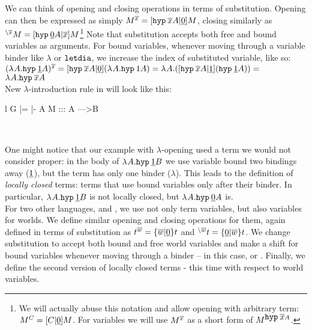 We can think of opening and closing operations in terms of substitution. Opening can then be expressed as simply $ M ^ {\overline{x}} = \mbox{$ [\mbox{$\operatorname{\texttt{hyp}}_{} {\overline{x}}$}A | \underline{0}] M$}$, closing similarly as ${}^ {\backslash{\overline{x}}} M = \mbox{$ [\mbox{$\operatorname{\texttt{hyp}}_{} {\underline{0}A}$} | \overline{x}] M$}$\footnote{We will actually abuse this notation and allow opening with arbitrary term: $M^C = \mbox{$ [C | \underline{0}] M$}$. For variables we will use $M ^ {\overline{x}}$ as a short form of $M^{\mbox{$\operatorname{\texttt{hyp}}_{} {\overline{x}}$}A}$.} 
Note that substitution accepts both free and bound variables as arguments. For bound variables, whenever moving through a variable binder like $\lambda$ or $\texttt{letdia}$, we increase the index of substituted variable, like so:\\
$(\lamb{A}{\hyp{\bvar 1}A})^{\fvar x}= \substt{\hyp{\fvar{x}}A}{\bvar{0}}{(\lamb{A}{\hyp{\bvar 1}A})} = \lamb{A}{(\substt{\hyp{\fvar{x}}A}{\bvar{1}} {(\hyp{\bvar{1}}A)})} =$\\$ \mbox{$\lambda_{} A . \mbox{$\operatorname{\texttt{hyp}}_{} {\overline{x}}$}A$}$\\

New $\lambda$-introduction rule in \langLF{} will look like this:

\begin{center}
\footnotesize
\begin{tabular}{ l }
			    {G |= \Gamma |- \lamb A M ::: A --->B}
\end{tabular}\\
\normalsize
\end{center}

One might notice that our example with $\lambda$-opening used a term we would not consider proper: in the body of $\mbox{$\lambda_{} A . \mbox{$\operatorname{\texttt{hyp}}_{} {\underline{1}}$}B$}$ we use variable bound two bindings away ($\underline{1}$), but the term has only one binder ($\lambda$). This leads to the definition of \emph{locally closed} terms: terms that use bound variables only after their binder. In particular, $\mbox{$\lambda_{} A . \mbox{$\operatorname{\texttt{hyp}}_{} {\underline{1}}$}B$}$ is not locally closed, but $\mbox{$\lambda_{} A . \mbox{$\operatorname{\texttt{hyp}}_{} {\underline{0}}$}A$}$ is.\\

For two other languages, \langHyb{} and \langL{}, we use not only term variables, but also variables for worlds. We define similar opening and closing operations for them, again defined in terms of substitution as $ t ^ {\overline{w}} = \mbox{$ \{\overline{w} | \underline{0} \} t$}$ and ${}^ {\backslash{\overline{w}}} t = \mbox{$ \{\underline{0} | \overline{w} \} t$}$. We change substitution to accept both bound and free world variables and make a shift for bound variables whenever moving through a binder -- in this case, \bboxe{} or . Finally, we define the second version of locally closed terms - this time with respect to world variables.\\

